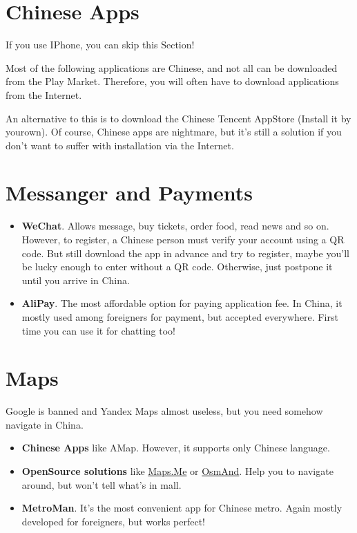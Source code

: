\section[Chinese Apps]{Chinese Apps}\label{sec:chinese-apps}
If you use IPhone, you can skip this Section!

Most of the following applications are Chinese,
and not all can be downloaded from the Play Market.
Therefore, you will often have to download applications from the Internet.

An alternative to this is to download the Chinese Tencent AppStore (Install it by yourown).
Of course, Chinese apps are nightmare, but it's still a solution
if you don't want to suffer with installation via the Internet.




\section[Messanger and Payments]{Messanger and Payments}\label{sec:messanger-and-payments}

\begin{itemize}
    \item \textbf{WeChat}.
    Allows message, buy tickets, order food, read news and so on.
    However, to register, a Chinese person must verify your account using a QR code.
    But still download the app in advance and try to register,
    maybe you'll be lucky enough to enter without a QR code.
    Otherwise, just postpone it until you arrive in China.

    \item \textbf{AliPay}.
    The most affordable option for paying application fee.
    In China, it mostly used among foreigners for payment, but accepted everywhere.
    First time you can use it for chatting too!
\end{itemize}




\section[Maps]{Maps}\label{sec:ru_maps}

Google is banned and Yandex Maps almost useless, but you need somehow navigate in China.


\begin{itemize}
    \item \textbf{Chinese Apps} like AMap.
        However, it supports only Chinese language.

    \item \textbf{OpenSource solutions} like \href{https://maps.me/}{Maps.Me} or \href{https://osmand.net/}{OsmAnd}.
        Help you to navigate around, but won't tell what's in mall.

    \item \textbf{MetroMan}.
        It's the most convenient app for Chinese metro.
        Again mostly developed for foreigners, but works perfect!
\end{itemize}




